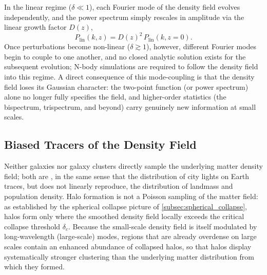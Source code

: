 \begin{observationblock}
In the linear regime ($\delta \ll 1$), each Fourier mode of the density field evolves independently, and the power spectrum simply rescales in amplitude via the linear growth factor $D(z)$,
\medskip
$$
P_{\text{lin}}(k,z) = D(z)^2\, P_{\text{lin}}(k, z=0) .
$$
Once perturbations become non-linear ($\delta \gtrsim 1$), however, different Fourier modes begin to couple to one another, and no closed analytic solution exists for the subsequent evolution; N-body simulations are required to follow the density field into this regime. A direct consequence of this mode-coupling is that the density field loses its Gaussian character: the two-point function (or power spectrum) alone no longer fully specifies the field, and higher-order statistics (the bispectrum, trispectrum, and beyond) carry genuinely new information at small scales.
\end{observationblock}

\subsection{Biased Tracers of the Density Field} \label{subsec:bias}

Neither galaxies nor galaxy clusters directly sample the underlying matter density field; both are , in the same sense that the distribution of city lights on Earth traces, but does not linearly reproduce, the distribution of landmass and population density. Halo formation is not a Poisson sampling of the matter field: as established by the spherical collapse picture of \cref{subsec:spherical_collapse}, halos form only where the smoothed density field locally exceeds the critical collapse threshold $\delta_c$. Because the small-scale density field is itself modulated by long-wavelength (large-scale) modes, regions that are already overdense on large scales contain an enhanced abundance of collapsed halos, so that halos display systematically stronger clustering than the underlying matter distribution from which they formed.

\medskip

